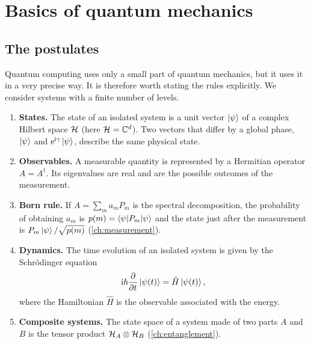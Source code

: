\chapter{Basics of quantum mechanics}\label{ch:qm}

\section{The postulates}
Quantum computing uses only a small part of quantum mechanics, but it uses it in a very precise way.
It is therefore worth stating the rules explicitly. We consider systems with a finite number of levels.

\begin{enumerate}[label=\textbf{P\arabic*.}]
  \item \textbf{States.} The state of an isolated system is a unit vector $\left|\psi\right\rangle$ of a complex Hilbert space $\mathcal H$
  (here $\mathcal H=\mathbb C^d$). Two vectors that differ by a global phase, $\left|\psi\right\rangle$ and $\mathrm e^{\mathrm i\gamma}\left|\psi\right\rangle$, describe the same physical state.
  \item \textbf{Observables.} A measurable quantity is represented by a Hermitian operator $A=A^\dagger$. Its eigenvalues are real
  and are the possible outcomes of the measurement.
  \item \textbf{Born rule.} If $A=\sum_m a_m P_m$ is the spectral decomposition, the probability of obtaining $a_m$ is
  $p(m)=\left\langle\psi\middle|P_m\middle|\psi\right\rangle$ and the state just after the measurement is $P_m\left|\psi\right\rangle/\sqrt{p(m)}$ (\cref{ch:measurement}).
  \item \textbf{Dynamics.} The time evolution of an isolated system is given by the Schrödinger equation
  \begin{equation}\label{eq:schrodinger}
    \mathrm i\hbar\frac{\partial}{\partial t}\left|\psi(t)\right\rangle=\hat H\left|\psi(t)\right\rangle,
  \end{equation}
  where the Hamiltonian $\hat H$ is the observable associated with the energy.
  \item \textbf{Composite systems.} The state space of a system made of two parts $A$ and $B$ is the tensor product $\mathcal H_A\otimes\mathcal H_B$
  (\cref{ch:entanglement}).
\end{enumerate}

